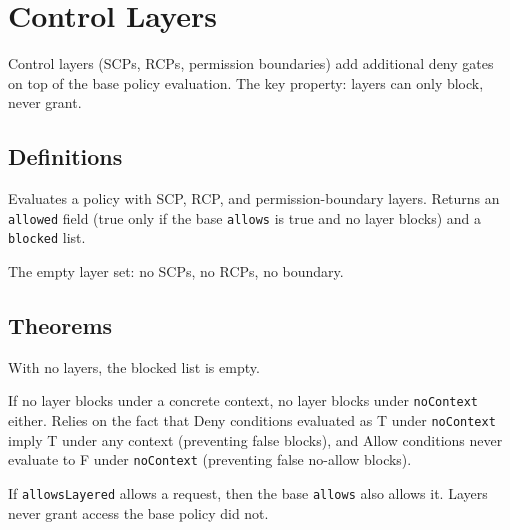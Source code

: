 \chapter{Control Layers}\label{chap:layers}

Control layers (SCPs, RCPs, permission boundaries) add additional
deny gates on top of the base policy evaluation.  The key property:
layers can only block, never grant.

\section{Definitions}

\begin{definition}[allowsLayered]\label{def:allowsLayered}
\leanok
Evaluates a policy with SCP, RCP, and permission-boundary layers.
Returns an \texttt{allowed} field (true only if the base \texttt{allows}
is true and no layer blocks) and a \texttt{blocked} list.
\end{definition}

\begin{definition}[noLayers]\label{def:noLayers}
\leanok
The empty layer set: no SCPs, no RCPs, no boundary.
\end{definition}

\section{Theorems}

\begin{theorem}\label{thm:evalLayers_noLayers_blocked}
\leanok
With no layers, the blocked list is empty.
\end{theorem}

\begin{theorem}\label{thm:evalLayers_blocked_noContext_empty}
\leanok
If no layer blocks under a concrete context, no layer blocks under
\texttt{noContext} either.  Relies on the fact that Deny conditions
evaluated as T under \texttt{noContext} imply T under any context
(preventing false blocks), and Allow conditions never evaluate to F
under \texttt{noContext} (preventing false no-allow blocks).
\end{theorem}

\begin{theorem}\label{thm:layers_narrow}
\leanok
If \texttt{allowsLayered} allows a request, then the base
\texttt{allows} also allows it.  Layers never grant access the
base policy did not.
\end{theorem}

